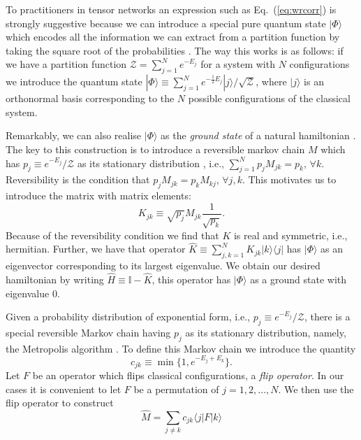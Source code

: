 \documentclass[prl,twocolumn,lengthcheck,superscriptaddress]{revtex4-1}
\theoremstyle{definition}
\theoremstyle{remark}
\begin{document}
To practitioners in tensor networks an expression such as Eq.~(\ref{eq:wrcorr}) is strongly suggestive because we can introduce a special pure quantum state $|\Phi\rangle$ which encodes all the information we can extract from a partition function by taking the square root of the probabilities \cite{rudolph:2002a, aharonov:2003a}. The way this works is as follows: if we have a partition function $\mathcal{Z} = \sum_{j=1}^N e^{-E_j}$ for a system with $N$ configurations we introduce the quantum state $|\Phi\rangle \equiv \sum_{j=1}^N e^{-\frac12E_j}|j\rangle/\sqrt{\mathcal{Z}}$, where $|j\rangle$ is an orthonormal basis corresponding to the $N$ possible configurations of the classical system. 

Remarkably, we can also realise $|\Phi\rangle$ as the \emph{ground state} of a natural hamiltonian \cite{ardonne:2004a, verstraete:2006a, perez-garcia:2008a, horava:2008a}. The key to this construction is to introduce a reversible markov chain $M$ which has $p_j \equiv  e^{-E_j}/\mathcal{Z}$ as its stationary distribution \cite{norris:1997a}, i.e., $\sum_{j=1}^N p_jM_{jk} = p_k$, $\forall k$. Reversibility is the condition that $p_j M_{jk} = p_kM_{kj}$, $\forall j,k$. This motivates us to introduce the  matrix with matrix elements:
\begin{equation}
	K_{jk} \equiv \sqrt{p_j} M_{jk} \frac{1}{\sqrt{p_k}}.
\end{equation}
Because of the reversibility condition we find that $K$ is real and symmetric, i.e., hermitian. Further, we have that operator $\widehat{K} \equiv  \sum_{j,k=1}^N K_{jk}|k\rangle \langle j|$ has $|\Phi\rangle$ as an eigenvector corresponding to its largest eigenvalue. We obtain our desired hamiltonian by writing $\widehat{H} \equiv \mathbb{I} - \widehat{K}$, this operator has $|\Phi\rangle$ as a ground state with eigenvalue $0$.

Given a probability distribution of exponential form, i.e., $p_j \equiv  e^{-E_j}/\mathcal{Z}$, there is a special reversible Markov chain having $p_j$ as its stationary distribution, namely, the Metropolis algorithm \cite{metropolis:1953a}. To define this Markov chain we introduce the quantity
\begin{equation}
	c_{jk} \equiv \min\{1, e^{-E_j+E_k}\}.
\end{equation}
Let $F$ be an operator which flips classical configurations, a \emph{flip operator}. In our cases it is convenient to let $F$ be a permutation of $j=1, 2, \ldots, N$. We then use the flip operator to construct
\begin{equation}
	\widehat{M} = \sum_{j\not=k} c_{jk}\langle j|F|k\rangle
\end{equation} 
\end{document}
